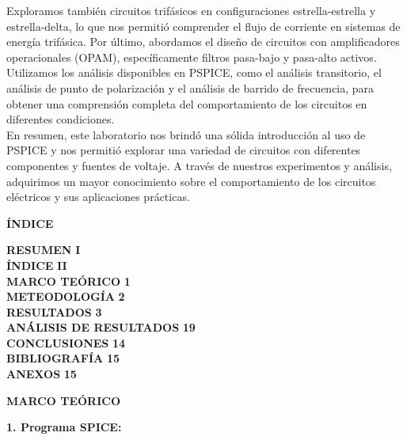 \documentclass[12pt]{article}
\begin{document}
	Exploramos también circuitos trifásicos en configuraciones estrella-estrella y estrella-delta, lo que nos permitió comprender el flujo de corriente en sistemas de energía trifásica. Por último, abordamos el diseño de circuitos con amplificadores operacionales (OPAM), específicamente filtros pasa-bajo y pasa-alto activos. Utilizamos los análisis disponibles en PSPICE, como el análisis transitorio, el análisis de punto de polarización y el análisis de barrido de frecuencia, para obtener una comprensión completa del comportamiento de los circuitos en diferentes condiciones.\\
	
	En resumen, este laboratorio nos brindó una sólida introducción al uso de PSPICE y nos permitió explorar una variedad de circuitos con diferentes componentes y fuentes de voltaje. A través de nuestros experimentos y análisis, adquirimos un mayor conocimiento sobre el comportamiento de los circuitos eléctricos y sus aplicaciones prácticas.\\
	
	\newpage
	
	\begin{center}
		\textbf{\large ÍNDICE}\\
	\end{center}
	
	\noindent \textbf{RESUMEN} \hfill \textbf{I}\\
	\noindent \textbf{ÍNDICE} \hfill \textbf{II}\\
	\noindent \textbf{MARCO TEÓRICO} \hfill \textbf{1}\\
	\noindent \textbf{METEODOLOGÍA} \hfill \textbf{2}\\
	\noindent \textbf{RESULTADOS} \hfill \textbf{3}\\
	\noindent \textbf{ANÁLISIS DE RESULTADOS} \hfill \textbf{19}\\
	\noindent \textbf{CONCLUSIONES} \hfill \textbf{14}\\
	\noindent \textbf{BIBLIOGRAFÍA} \hfill \textbf{15}\\
	\noindent \textbf{ANEXOS} \hfill \textbf{15}\\
	
	\newpage
	
	
	\begin{center}
		\textbf{\large MARCO TEÓRICO}\\
	\end{center}
	
	\textbf{1. Programa SPICE:}\\
	
\end{document}
